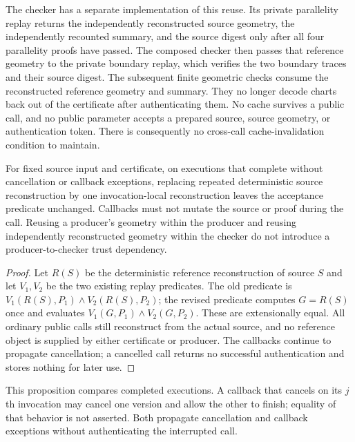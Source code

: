 The checker has a separate implementation of this reuse.  Its private
parallelity replay returns the independently reconstructed source geometry,
the independently recounted summary, and the source digest only after all
four parallelity proofs have passed.  The composed checker then passes that
reference geometry to the private boundary replay, which verifies the two
boundary traces and their source digest.  The subsequent finite geometric
checks consume the reconstructed reference geometry and summary.  They no
longer decode charts back out of the certificate after authenticating them.
No cache survives a public call, and no public parameter accepts a prepared
source, source geometry, or authentication token.  There is consequently no
cross-call cache-invalidation condition to maintain.

\begin{proposition}
For fixed source input and certificate, on executions that complete without
cancellation or callback exceptions, replacing repeated deterministic source
reconstruction by one invocation-local reconstruction leaves the acceptance
predicate unchanged.  Callbacks must not mutate the source or proof during
the call.  Reusing a producer's geometry within the
producer and reusing independently reconstructed geometry within the checker
do not introduce a producer-to-checker trust dependency.
\end{proposition}

\begin{proof}
Let $R(S)$ be the deterministic reference reconstruction of source $S$ and
let $V_1,V_2$ be the two existing replay predicates.  The old predicate is
$V_1(R(S),P_1)\wedge V_2(R(S),P_2)$; the revised predicate computes
$G=R(S)$ once and evaluates $V_1(G,P_1)\wedge V_2(G,P_2)$.  These are
extensionally equal.  All ordinary public calls still reconstruct from the
actual source, and no reference object is supplied by either certificate
or producer.  The callbacks continue to propagate cancellation; a cancelled
call returns no successful authentication and stores nothing for later use.
\end{proof}

This proposition compares completed executions.  A callback that cancels on
its $j$th invocation may cancel one version and allow the other to finish;
equality of that behavior is not asserted.  Both propagate cancellation and
callback exceptions without authenticating the interrupted call.

